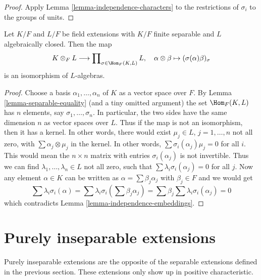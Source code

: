 \begin{proof}
Apply Lemma \ref{lemma-independence-characters} to
the restrictions of $\sigma_i$ to the groups of units.
\end{proof}

\begin{lemma}
\label{lemma-finite-separable-tensor-alg-closed}
Let $K/F$ and $L/F$ be field extensions with
$K/F$ finite separable and $L$ algebraically closed.
Then the map
$$
K \otimes_F L
\longrightarrow
\prod\nolimits_{\sigma \in \Hom_F(K, L)} L,\quad
\alpha \otimes \beta \mapsto (\sigma(\alpha)\beta)_\sigma
$$
is an isomorphism of $L$-algebras.
\end{lemma}

\begin{proof}
Choose a basis $\alpha_1, \ldots, \alpha_n$ of $K$ as a vector space over $F$.
By Lemma \ref{lemma-separable-equality} (and a tiny omitted argument) the set
$\Hom_F(K, L)$ has $n$ elements, say $\sigma_1, \ldots, \sigma_n$.
In particular, the two sides have the same dimension $n$ as vector
spaces over $L$. Thus if the map is not an isomorphism, then it
has a kernel. In other words, there would exist
$\mu_j \in L$, $j = 1, \ldots, n$ not all zero,
with $\sum \alpha_j \otimes \mu_j$ in the kernel.
In other words, $\sum \sigma_i(\alpha_j)\mu_j = 0$ for all $i$.
This would mean the $n \times n$ matrix with entries
$\sigma_i(\alpha_j)$ is not invertible. Thus we can find
$\lambda_1, \ldots, \lambda_n \in L$ not all zero,
such that $\sum \lambda_i\sigma_i(\alpha_j) = 0$ for all $j$.
Now any element $\alpha \in K$ can be written as
$\alpha = \sum \beta_j \alpha_j$ with $\beta_j \in F$ and we would get
$$
\sum \lambda_i\sigma_i(\alpha) =
\sum \lambda_i\sigma_i(\sum \beta_j \alpha_j) =
\sum \beta_j \sum \lambda_i\sigma_i(\alpha_j) = 0
$$
which contradicts Lemma \ref{lemma-independence-embeddings}.
\end{proof}







\section{Purely inseparable extensions}
\label{section-purely-inseparable}

\noindent
Purely inseparable extensions are the opposite of the separable
extensions defined in the previous section. These extensions only
show up in positive characteristic.

